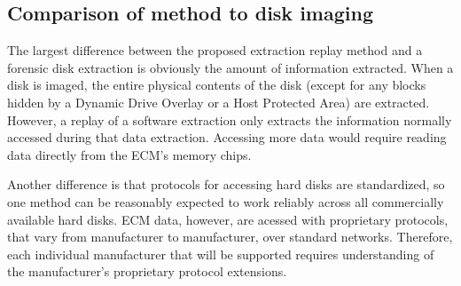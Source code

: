 \subsection{Comparison of method to disk imaging}

The largest difference between the proposed extraction replay method and a forensic disk extraction is obviously
the amount of information extracted. When a disk is imaged, the entire physical contents of the disk (except for
any blocks hidden by a Dynamic Drive Overlay or a Host Protected Area) are extracted. However, a replay of a
software extraction only extracts the information normally accessed during that data  extraction. Accessing more data
would require reading data directly from the ECM's memory chips.

Another difference is that protocols for accessing hard disks are standardized, so one method can be reasonably expected
to work reliably across all commercially available hard disks. ECM data, however, are acessed with proprietary protocols,
that vary from manufacturer to manufacturer, over standard networks. 
Therefore, each individual manufacturer that will be supported requires understanding of the  manufacturer's proprietary protocol extensions.
